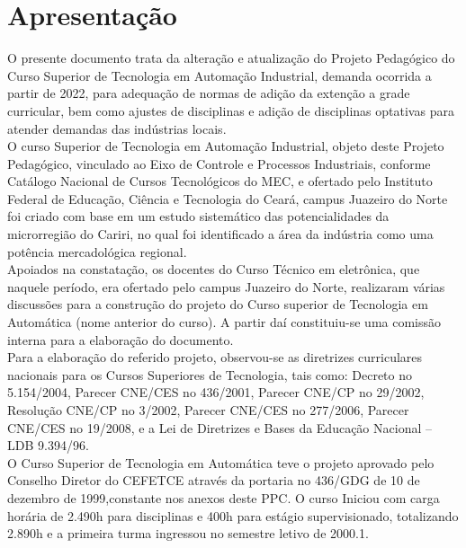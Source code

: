 \pagebreak

\chapter{Apresentação}
\OnehalfSpacing

O presente documento trata da alteração e atualização do Projeto Pedagógico do Curso Superior de Tecnologia em Automação Industrial, demanda ocorrida a partir de 2022, para adequação de normas de adição da extenção a grade curricular, bem como ajustes de disciplinas e adição de disciplinas optativas para atender demandas das indústrias locais.\\

O curso Superior de Tecnologia em Automação Industrial, objeto deste Projeto Pedagógico, vinculado ao Eixo de Controle e Processos Industriais, conforme Catálogo Nacional de Cursos Tecnológicos do MEC, e ofertado pelo Instituto Federal de Educação, Ciência e Tecnologia do Ceará, campus Juazeiro do Norte foi criado com base em um estudo sistemático das  potencialidades da microrregião do Cariri, no qual foi identificado a área da indústria como uma potência mercadológica regional.\\

Apoiados na constatação, os docentes do Curso Técnico em eletrônica, que naquele período, era ofertado pelo campus Juazeiro do Norte, realizaram várias discussões para a construção do projeto do Curso superior de Tecnologia em Automática (nome anterior do curso). A partir daí constituiu-se uma comissão interna para a elaboração do documento.\\

Para a elaboração do referido projeto, observou-se as diretrizes curriculares nacionais para os Cursos Superiores de Tecnologia, tais como: Decreto no 5.154/2004, Parecer CNE/CES no 436/2001, Parecer CNE/CP no 29/2002, Resolução CNE/CP no 3/2002, Parecer CNE/CES no 277/2006, Parecer CNE/CES no 19/2008, e a Lei de Diretrizes e Bases da Educação Nacional – LDB 9.394/96.\\

O Curso Superior de Tecnologia em Automática teve o projeto aprovado pelo Conselho Diretor do CEFETCE através da portaria no 436/GDG de 10 de dezembro de 1999,constante nos anexos deste PPC. O curso Iniciou com carga horária de 2.490h para disciplinas e 400h para estágio supervisionado, totalizando 2.890h e a primeira turma ingressou no semestre letivo de 2000.1.\\

